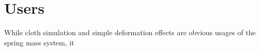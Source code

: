 \chapter{Users}
While cloth simulation and simple deformation effects are obvious usages of the spring mass system, it 
